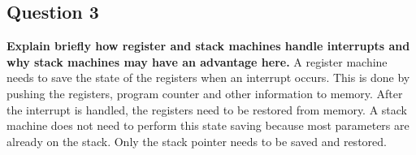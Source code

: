 \subsection*{Question 3}
\textbf{Explain briefly how register and stack machines handle interrupts and why stack machines may have an advantage here.}
A register machine needs to save the state of the registers when an interrupt occurs. This is done by pushing the registers, program counter and other information to memory. After the interrupt is handled, the registers need to be restored from memory. A stack machine does not need to perform this state saving because most parameters are already on the stack. Only the stack pointer needs to be saved and restored.



